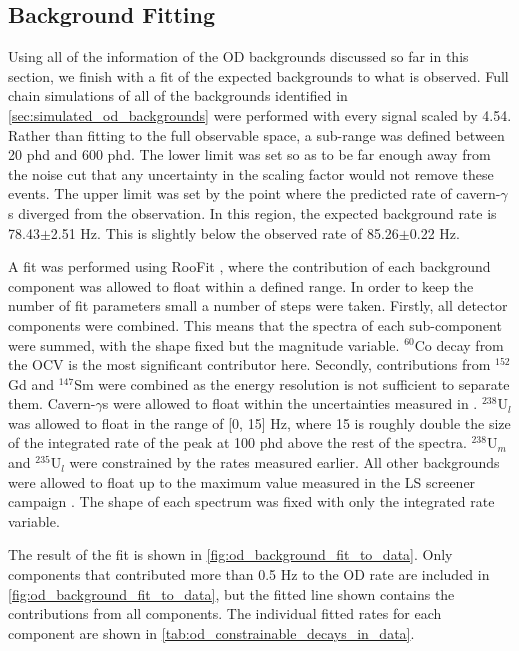 \subsection{Background Fitting}
\par
Using all of the information of the OD backgrounds discussed so far in this section, we finish with a fit of the expected backgrounds to what is observed.
Full chain simulations of all of the backgrounds identified in \autoref{sec:simulated_od_backgrounds} were performed with every signal scaled by 4.54.
Rather than fitting to the full observable space, a sub-range was defined between 20 phd and 600 phd.
The lower limit was set so as to be far enough away from the noise cut that any uncertainty in the scaling factor would not remove these events.
The upper limit was set by the point where the predicted rate of cavern-$\gamma$s diverged from the observation.
In this region, the expected background rate is 78.43$\pm$2.51 Hz.
This is slightly below the observed rate of 85.26$\pm$0.22 Hz.
\par
A fit was performed using RooFit \cite{roostats_ref}, where the contribution of each background component was allowed to float within a defined range.
In order to keep the number of fit parameters small a number of steps were taken.
Firstly, all detector components were combined.
This means that the spectra of each sub-component were summed, with the shape fixed but the magnitude variable.
${}^{60}$Co decay from the OCV is the most significant contributor here.
Secondly, contributions from ${}^{152}$Gd and ${}^{147}$Sm were combined as the energy resolution is not sufficient to separate them.
Cavern-$\gamma$s were allowed to float within the uncertainties measured in \cite{LZ_Gamma_Ray_Background_ref}.
${}^{238}$U$_l$ was allowed to float in the range of [0, 15] Hz, where 15 is roughly double the size of the integrated rate of the peak at 100 phd above the rest of the spectra.
${}^{238}$U$_{m}$ and ${}^{235}$U$_{l}$ were constrained by the rates measured earlier.
All other backgrounds were allowed to float up to the maximum value measured in the LS screener campaign \cite{scotthaselschwardt_thesis_ref}.
The shape of each spectrum was fixed with only the integrated rate variable.
\par
The result of the fit is shown in \autoref{fig:od_background_fit_to_data}.
Only components that contributed more than 0.5 Hz to the OD rate are included in \autoref{fig:od_background_fit_to_data}, but the fitted line shown contains the contributions from all components.
The individual fitted rates for each component are shown in \autoref{tab:od_constrainable_decays_in_data}.
